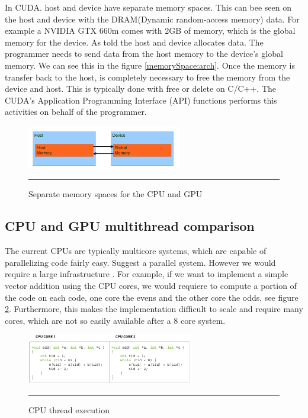 In CUDA. host and device have separate memory spaces. This can bee seen on the host and device with the DRAM(Dynamic random-access memory) data. For example a NVIDIA GTX 660m comes with 2GB of memory, which is the global memory for the device. As told the host and device allocates data. The programmer needs to send data from the host memory to the device's global memory. We can see this in the figure  \ref{memorySpace:arch}.  Once the memory is transfer back to the host, is completely necessary to free the memory from the device and host. This is typically done with free or delete on C/C++. The CUDA's Application Programming Interface (API) functions performs this activities on behalf of the programmer.   \cite{hwu}

\begin{figure}[htbp]
	\centering
		\includegraphics[width=0.6\textwidth]{Figures/memorySpace.png}
		\rule{35em}{0.5pt}
	\caption[Memory Space GPU and CPU]{Separate memory spaces for the CPU and GPU}
	\label{fig:memorySpace}
\end{figure}

\subsection{CPU and GPU multithread comparison}

The current CPUs are typically multicore systems, which are capable of parallelizing code fairly easy. Suggest a parallel system. However we would require a large infrastructure  \cite{example}. For example, if we want to implement a simple vector addition using the CPU cores, we would requiere to compute a portion of the code on each code, one core the evens and the other core the odds, see figure \ref{fig:cpu}. Furthermore, this makes the implementation difficult to scale and require many cores, which are not so easily available after a 8 core system. 

\begin{figure}[htbp]
	\centering
		\includegraphics[width=0.65\textwidth]{Figures/cpu.png}
		\rule{35em}{0.5pt}
	\caption[CPU Thread execution]{CPU thread execution}
	\label{fig:cpu}
\end{figure}




